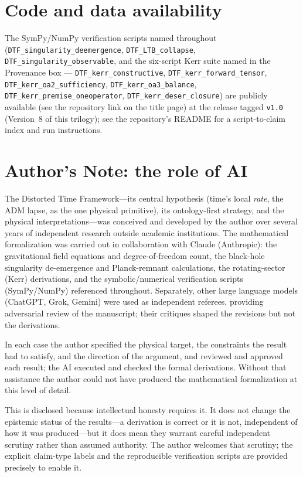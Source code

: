 \documentclass[11pt]{article}
\begin{document}
\section*{Code and data availability}
{\small The SymPy/NumPy verification scripts named throughout (\texttt{DTF\_singularity\_deemergence},
\texttt{DTF\_LTB\_collapse}, \texttt{DTF\_singularity\_observable}, and the six-script Kerr suite named in
the Provenance box --- \texttt{DTF\_kerr\_constructive}, \texttt{DTF\_kerr\_forward\_tensor},
\texttt{DTF\_kerr\_oa2\_sufficiency}, \texttt{DTF\_kerr\_oa3\_balance},
\texttt{DTF\_kerr\_premise\_oneoperator}, \texttt{DTF\_kerr\_deser\_closure}) are publicly available (see
the repository link on the title page) at the release tagged \texttt{v1.0} (Version~8 of this trilogy); see
the repository's README for a script-to-claim index and run instructions.\par}

\section*{Author's Note: the role of AI}
{\small
The Distorted Time Framework---its central hypothesis (time's local \emph{rate}, the ADM lapse,
as the one physical primitive), its ontology-first strategy, and the physical
interpretations---was conceived and developed by the author over several years of independent
research outside academic institutions. The mathematical formalization was carried out in
collaboration with Claude (Anthropic): the gravitational field equations and degree-of-freedom
count, the black-hole singularity de-emergence and Planck-remnant calculations, the rotating-sector
(Kerr) derivations, and the symbolic/numerical verification scripts (SymPy/NumPy) referenced
throughout. Separately, other large language models (ChatGPT, Grok, Gemini) were used as independent
referees, providing adversarial review of the manuscript; their critiques shaped the revisions but
not the derivations.

In each case the author specified the physical target, the constraints the result had to satisfy,
and the direction of the argument, and reviewed and approved each result; the AI executed and
checked the formal derivations. Without that assistance the author could not have produced the
mathematical formalization at this level of detail.

This is disclosed because intellectual honesty requires it. It does not change the epistemic status
of the results---a derivation is correct or it is not, independent of how it was produced---but it
does mean they warrant careful independent scrutiny rather than assumed authority. The author
welcomes that scrutiny; the explicit claim-type labels and the reproducible verification scripts are
provided precisely to enable it.
\par}
\end{document}
